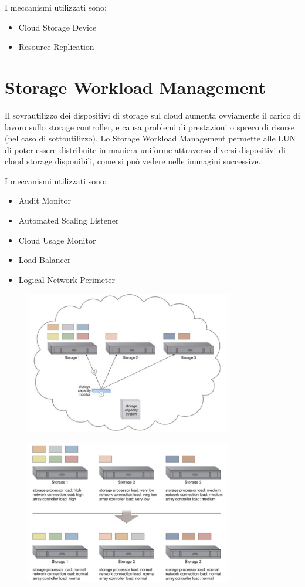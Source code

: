 I meccanismi utilizzati sono:
\begin{itemize}
    \item Cloud Storage Device
    \item Resource Replication
\end{itemize}

\section{Storage Workload Management}
Il sovrautilizzo dei dispositivi di storage sul cloud aumenta ovviamente il carico di lavoro sullo storage controller, e causa problemi di prestazioni o spreco di risorse (nel caso di sottoutilizzo). Lo Storage Workload Management permette alle LUN di poter essere distribuite in maniera uniforme attraverso diversi dispositivi di cloud storage disponibili, come si può vedere nelle immagini successive.

I meccanismi utilizzati sono:
\begin{itemize}
    \item Audit Monitor
    \item Automated Scaling Listener
    \item Cloud Usage Monitor
    \item Load Balancer
    \item Logical Network Perimeter
\end{itemize}

\begin{figure}[htb!]
    \centering
    \includegraphics[width=9cm]{./Images/cap12/12.11.png}
\end{figure}

\begin{figure}[htb!]
    \centering
    \includegraphics[width=9cm]{./Images/cap12/12.12.png}
\end{figure}

